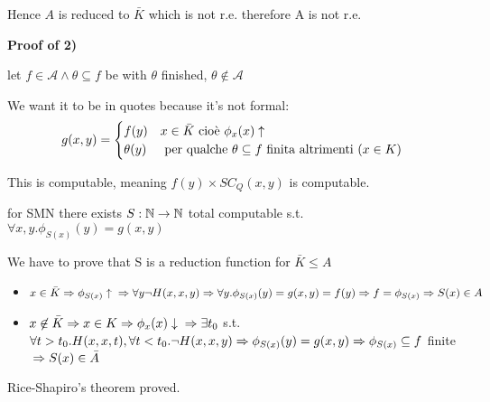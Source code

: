 Hence $A$ is reduced to $ \bar{K} $ which is not r.e. therefore A is not r.e.

\textbf{Proof of 2)}

let $ f\in\mathcal{A}\land\theta\subseteq f $ be with $ \theta $ finished, $ \theta\not\in\mathcal{A} $

We want it to be in quotes because it's not formal: \begin{equation*}
  g(x,y) = \begin{cases}
    f(y)      & x \in\bar{K} $ cioè $ \phi_x(x)\uparrow                              \\
    \theta(y) & $ per qualche $ \theta\subseteq f $ finita altrimenti ($ x\in K $) $
  \end{cases}
\end{equation*}

This is computable, meaning $f(y) \times SC_Q(x,y) $ is computable.

for SMN there exists $ S:\mathbb{N}\rightarrow\mathbb{N} $ total computable s.t. $ \forall x,y. \phi_{S(x)}(y) = g(x,y) $

We have to prove that S is a reduction function for $ \bar{K}\leq A $

\begin{itemize}
\item $ x\in\bar{K}\\
  \Rightarrow\phi_{S(x)}\uparrow \\
  \Rightarrow\forall y\lnot H(x,x,y)\\
  \Rightarrow \forall y.\phi_{S(x)}(y) = g(x,y) = f(y)\\
  \Rightarrow f = \phi_{S(x)}\\ \Rightarrow S(x)\in A$
\item $ x\not\in\bar{K}\\ \Rightarrow x\in K\\
  \Rightarrow \phi_x(x)\downarrow\\
  \Rightarrow \exists t_0 $ s.t. $ \forall t>t_0. H(x,x,t), \forall t<t_0. \lnot H(x,x,y)\\
  \Rightarrow\phi_{S(x)}(y) = g(x,y)\\
  \Rightarrow \phi_{S(x)}\subseteq f$ finite $\\
  \Rightarrow S(x) \in \bar{A} $
\end{itemize}

Rice-Shapiro's theorem proved.